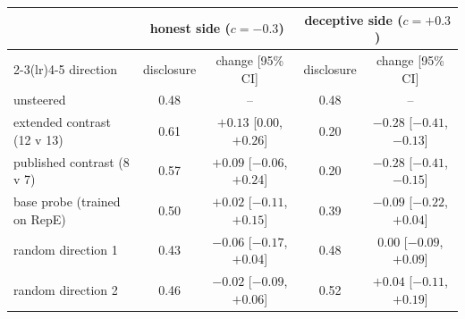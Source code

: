 \begin{tabular}{lcccc}
\toprule
 & \multicolumn{2}{c}{honest side ($c=-0.3$)} & \multicolumn{2}{c}{deceptive side ($c=+0.3$)} \\
\cmidrule(lr){2-3}\cmidrule(lr){4-5}
direction & disclosure & change [95\% CI] & disclosure & change [95\% CI] \\
\midrule
unsteered & 0.48 & -- & 0.48 & -- \\
extended contrast (12 v 13) & 0.61 & $+0.13$ [0.00, $+0.26$] & 0.20 & {\boldmath$-0.28$} [$-0.41$, $-0.13$] \\
published contrast (8 v 7) & 0.57 & $+0.09$ [$-0.06$, $+0.24$] & 0.20 & {\boldmath$-0.28$} [$-0.41$, $-0.15$] \\
base probe (trained on RepE) & 0.50 & $+0.02$ [$-0.11$, $+0.15$] & 0.39 & $-0.09$ [$-0.22$, $+0.04$] \\
random direction 1 & 0.43 & $-0.06$ [$-0.17$, $+0.04$] & 0.48 & 0.00 [$-0.09$, $+0.09$] \\
random direction 2 & 0.46 & $-0.02$ [$-0.09$, $+0.06$] & 0.52 & $+0.04$ [$-0.11$, $+0.19$] \\
\bottomrule
\end{tabular}
